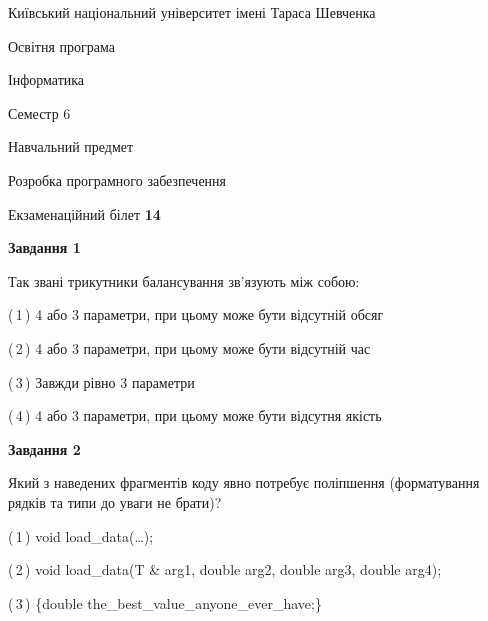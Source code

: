 \documentclass[10pt, ukrainian]{article}
\begin{document}
{{\begin {small}\par
{ \center  Київський національний університет імені Тараса Шевченка \par}
{\parbox {5 cm}{Освітня програма \hfill}{\parbox {7 cm}{Інформатика \hfill}}\parbox {6 cm}{\hfill Семестр 6}}\par
{\parbox {5 cm} {Навчальний предмет \hfill}\parbox {7 cm}{Розробка програмного забезпечення \hfill}\parbox {6cm}{\hfill}\par}\vspace{-7pt} \end{small}}{\center Екзаменаційний білет \No \textbf
{ 14 }\par}}
{
\begin {large}
{\begin {center}\textbf{Завдання 1}\end {center}}\par
Так звані трикутники балансування зв'язують між собою:\par
\vspace{2mm}



(\,1\,) 4 або 3 параметри, при цьому може бути відсутній обсяг %



(\,2\,) 4 або 3 параметри, при цьому може бути відсутній час%



(\,3\,) Завжди рівно 3 параметри%



(\,4\,) 4 або 3 параметри, при цьому може бути відсутня якість%


{\begin {center}\textbf{Завдання 2}\end {center}}\par
Який з наведених фрагментів коду явно потребує поліпшення (форматування рядків та типи до уваги не брати)?\par
\vspace{2mm}



(\,1\,) void load\_data(…);%



(\,2\,) void load\_data(T \& arg1, double arg2, double arg3, double arg4); %



(\,3\,) \{double the\_best\_value\_anyone\_ever\_have;\} %




\end{large}}
\end{document}
